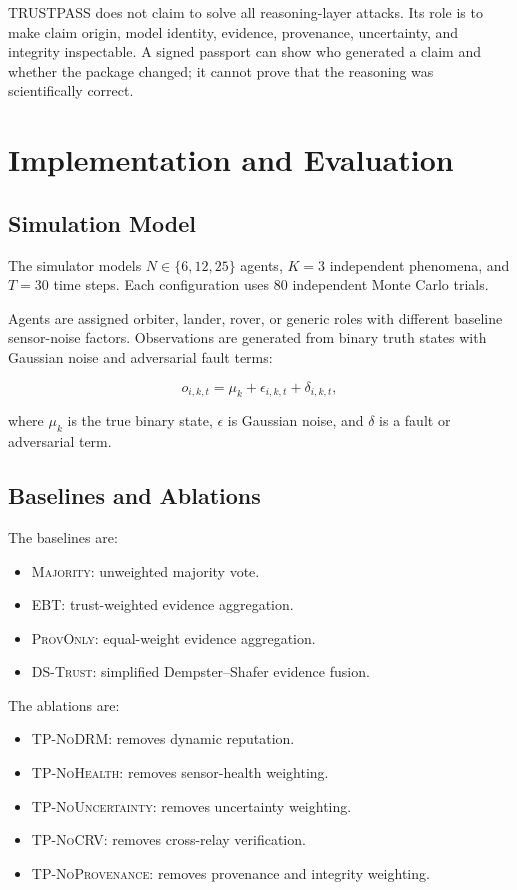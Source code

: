 \documentclass[10pt,conference]{IEEEtran}
\begin{document}
TRUSTPASS does not claim to solve all reasoning-layer attacks. Its role is to make claim origin, model identity, evidence, provenance, uncertainty, and integrity inspectable. A signed passport can show who generated a claim and whether the package changed; it cannot prove that the reasoning was scientifically correct.

\section{Implementation and Evaluation}
\label{sec:implementation}

\subsection{Simulation Model}

The simulator models $N\in\{6,12,25\}$ agents, $K=3$ independent phenomena, and $T=30$ time steps. Each configuration uses 80 independent Monte Carlo trials.

Agents are assigned orbiter, lander, rover, or generic roles with different baseline sensor-noise factors. Observations are generated from binary truth states with Gaussian noise and adversarial fault terms:

\begin{equation}
o_{i,k,t}
=
\mu_k+\epsilon_{i,k,t}+\delta_{i,k,t},
\end{equation}

where $\mu_k$ is the true binary state, $\epsilon$ is Gaussian noise, and $\delta$ is a fault or adversarial term.

\subsection{Baselines and Ablations}

The baselines are:

\begin{itemize}
  \item \textsc{Majority}: unweighted majority vote.
  \item \textsc{EBT}: trust-weighted evidence aggregation.
  \item \textsc{ProvOnly}: equal-weight evidence aggregation.
  \item \textsc{DS-Trust}: simplified Dempster--Shafer evidence fusion.
\end{itemize}

The ablations are:

\begin{itemize}
  \item \textsc{TP-NoDRM}: removes dynamic reputation.
  \item \textsc{TP-NoHealth}: removes sensor-health weighting.
  \item \textsc{TP-NoUncertainty}: removes uncertainty weighting.
  \item \textsc{TP-NoCRV}: removes cross-relay verification.
  \item \textsc{TP-NoProvenance}: removes provenance and integrity weighting.
\end{itemize}
\end{document}
